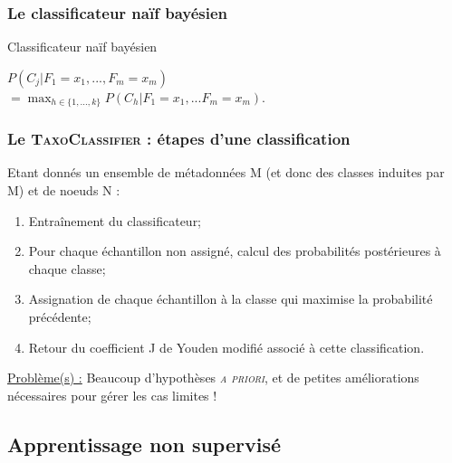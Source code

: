 \documentclass{beamer}
\begin{document}
\begin{frame}
\frametitle{Le classificateur naïf bayésien}
\begin{block}{Classificateur naïf bayésien}
\begin{center}
$P(C_{j} | F_{1} = x_{1}, ..., F_{m} = x_{m})$\\
$= \max_{h \in \{ 1, ..., k \}}P(C_{h} | F_{1} = x_{1}, ... F_{m} = x_{m})$.\\
\end{center}
\end{block}
\end{frame}

\begin{frame}
\frametitle{Le \textsc{\bf TaxoClassifier} : étapes d'une classification}

Etant donnés un ensemble de métadonnées M (et donc des classes induites par M) et de noeuds N :
\bigskip
\begin{enumerate}
\item \alert{Entraînement} du classificateur;
\item Pour chaque échantillon non assigné, calcul des \alert{probabilités postérieures} à chaque classe;
\item Assignation de chaque échantillon à la classe qui maximise la probabilité précédente;
\item Retour du coefficient J de Youden \alert{modifié} associé à cette classification.
\end{enumerate}

\bigskip

\uline{Problème(s) :} Beaucoup d'hypothèses \textsc{\it a priori}, et de petites améliorations nécessaires pour gérer les cas limites !

\end{frame}

\subsection{Apprentissage non supervisé}

\end{document}
